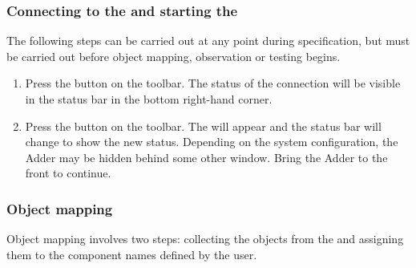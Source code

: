 \subsubsection{Connecting to the \gdserver and starting the \gdaut}
The following steps can be carried out at any point during specification, 
 but must be carried out before object mapping, observation or testing begins. 

\begin{enumerate}
\item Press the  button on the toolbar. The
status of the \gdserver connection will be visible in the status bar in the bottom
right-hand corner. 
\item Press the  button on the toolbar. The
\gdaut will appear and the  status 
bar will change to show the new status. Depending on the system 
configuration, the Adder may be hidden behind some other window. Bring the 
Adder to the front to continue. 
\end{enumerate}

\subsubsection{Object mapping}
Object mapping involves two steps: collecting the objects from the 
\gdaut and assigning them to the component names defined by the user. 

